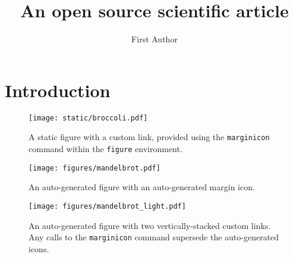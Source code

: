 \documentclass[twocolumn]{aastex631}
\begin{document}
\title{An open source scientific article}

\author{First Author}

\begin{abstract}
    \blindtext
\end{abstract}

\section{Introduction}

\begin{figure}[ht!]
    \begin{centering}
        \texttt{[image: static/broccoli.pdf]}
        \caption{
            A static figure with a custom link, provided using the
            \texttt{marginicon} command within the \texttt{figure}
            environment.
        }
        \label{fig:broccoli}
    \end{centering}
\end{figure}

\begin{figure}[ht!]
    \begin{centering}
        \texttt{[image: figures/mandelbrot.pdf]}
        \caption{
            An auto-generated figure with an auto-generated margin icon.
        }
        \label{fig:mandelbrot}
    \end{centering}
\end{figure}

\begin{figure}[ht!]
    \begin{centering}
        \texttt{[image: figures/mandelbrot\_light.pdf]}
        \caption{
            An auto-generated figure with two vertically-stacked custom links.
            Any calls to the \texttt{marginicon} command supersede the auto-generated icons.
        }
        \label{fig:mandelbrot_light}
    \end{centering}
\end{figure}
\end{document}
